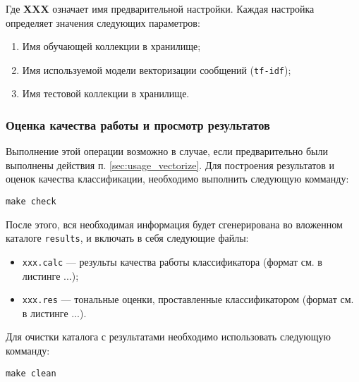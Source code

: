        Где {\bf XXX} означает имя предварительной настройки. Каждая настройка
        определяет значения следующих параметров:
        \begin{enumerate}
            \item Имя обучающей коллекции в хранилище;
            \item Имя используемой модели векторизации сообщений ({\tt tf-idf});
            \item Имя тестовой коллекции в хранилище.
        \end{enumerate}

        \subsubsection{Оценка качества работы и просмотр результатов}
        Выполнение этой операции возможно в случае, если предварительно были
        выполнены действия п. \ref{sec:usage_vectorize}.
        Для построения результатов и оценок качества классификации, необходимо
        выполнить следующую комманду:
        \begin{center}
            {\tt make check}
        \end{center}

        После этого, вся необходимая информация будет сгенерирована во вложенном
        каталоге {\tt results}, и включать в себя следующие файлы:
        \begin{itemize}
            \item {\tt xxx.calc} --- результы качества работы классификатора
            (формат см. в листинге ...);
            \item {\tt xxx.res} --- тональные оценки, проставленные
            классификатором (формат см. в листинге ...).
        \end{itemize}

        Для очистки каталога с результатами необходимо использовать следующую
        комманду:
        \begin{center}
            {\tt make clean}
        \end{center}

